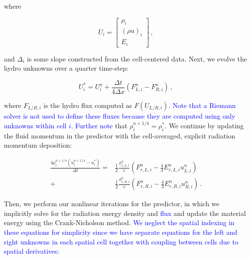 \documentclass[preprint,12pt]{elsarticle}
\newcommand{\URL}[1]{{\textcolor{blue}{#1}}}
\newcommand{\fn}[1]{\left( #1 \right)}
\newcommand{\be}{\begin{equation}}
\newcommand{\ee}{\end{equation}}
\newcommand{\pec}{\, ,}
\newcommand{\pep}{\, .}
\newcommand{\lequ}[1]{\label{eq:#1}}
\newcommand{\half}{\frac{1}{2}}
\begin{document}
\noindent where 

\be
U_i = \begin{bmatrix}
\displaystyle \rho_i \\ 
\displaystyle \fn{\rho u}_i \\
\displaystyle E_i 
\end{bmatrix}  \pec
\lequ{define_U}
\ee

\noindent and $\Delta_i$ is some slope constructed from the cell-centered data.  Next, we evolve the hydro unknowns over a quarter time-step:

\be
U_{i}^{*} = U_{i}^n + \frac{\Delta t}{4\Delta x}\fn{F_{L,i}^{n}-F_{R,i}^{n}} \pec
\lequ{evolved_quart}
\ee

\noindent where $F_{L/R,i}$ is the hydro flux computed as $F(U_{L/R,i})$. \URL{Note that a Riemann solver is not used to define these fluxes because they 
are computed using only unknowns within cell $i$.  Further note} that $\rho_{i}^{n+1/4} = \rho_{i}^{*}$.  We continue by updating the fluid momentum in the predictor with the cell-averaged, explicit radiation momentum deposition: 

\begin{align}
\nonumber\frac{4\rho^{n+1/4}_{i}\fn{u^{n+1/4}_{i}-u^{*}_{i}}}{\Delta t} = &\half\frac{\sigma_{t,L,i}^{n}}{c}\fn{F_{r,L,i}^{n}-\frac{4}{3}E_{r,L,i}^{n}u_{L,i}^{n}} \\
+&\half\frac{\sigma_{t,R,i}^{n}}{c}\fn{F_{r,R,i}^{n}-\frac{4}{3}E_{r,R,i}^{n}u_{R,i}^{n}} \pep
\lequ{mom_quart_up}
\end{align}
 
Then, we perform our nonlinear iterations for the predictor, in which we implicitly solve for the radiation energy density and \URL{flux} and update the material energy using the Crank-Nicholson method. \URL{ We neglect the spatial indexing in these equations for simplicity since we have 
separate equations} \URL{ for the left and right unknowns in each spatial cell together with coupling between cells due to spatial derivatives:} 
\end{document}
